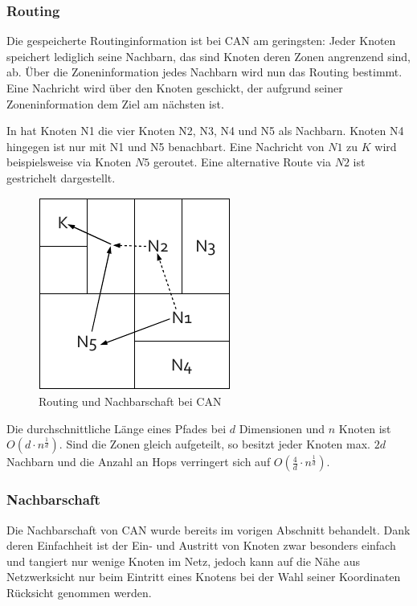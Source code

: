 \subsubsection{Routing} 
Die gespeicherte Routinginformation ist bei CAN am geringsten: Jeder Knoten speichert lediglich seine Nachbarn, das sind Knoten deren Zonen angrenzend sind, ab. Über die Zoneninformation jedes Nachbarn wird nun das Routing bestimmt. Eine Nachricht wird über den Knoten geschickt, der aufgrund seiner Zoneninformation dem Ziel am nächsten ist.

In  hat Knoten N1 die vier Knoten N2, N3, N4 und N5 als Nachbarn. Knoten N4 hingegen ist nur mit N1 und N5 benachbart. Eine Nachricht von $N1$ zu $K$ wird beispielsweise via Knoten $N5$ geroutet. Eine alternative Route via $N2$ ist gestrichelt dargestellt.

\begin{figure}[htbp]
\centering
\includegraphics{grafics/can_routing.pdf}
\caption{Routing und Nachbarschaft bei CAN}
\label{fig:can_routing}
\end{figure}

Die durchschnittliche Länge eines Pfades bei $d$ Dimensionen und $n$ Knoten ist $O(d\cdot n^\frac{1}{d})$. Sind die Zonen gleich aufgeteilt, so besitzt jeder Knoten max. $2d$ Nachbarn und die Anzahl an Hops verringert sich auf $O(\frac{4}{d}\cdot n^\frac{1}{d})$.

\subsubsection{Nachbarschaft}
Die Nachbarschaft von CAN wurde bereits im vorigen Abschnitt behandelt. Dank deren Einfachheit ist der Ein- und Austritt von Knoten zwar besonders einfach und tangiert nur wenige Knoten im Netz, jedoch kann auf die Nähe aus Netzwerksicht nur beim Eintritt eines Knotens bei der Wahl seiner Koordinaten Rücksicht genommen werden.

